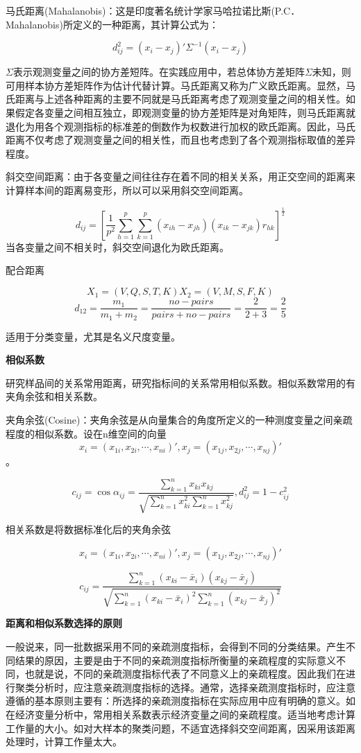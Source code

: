 \documentclass[]{ctexbook}
\begin{document}
马氏距离(Mahalanobis)：这是印度著名统计学家马哈拉诺比斯(P.C． Mahalanobis)所定义的一种距离，其计算公式为：

\[d_{ij}^2=(x_i-x_j)'\Sigma^{-1}(x_i-x_j)\]

\(\Sigma\)表示观测变量之间的协方差短阵。在实践应用中，若总体协方差矩阵\(\Sigma\)未知，则可用样本协方差矩阵作为估计代替计算。马氏距离又称为广义欧氏距离。显然，马氏距离与上述各种距离的主要不同就是马氏距离考虑了观测变量之间的相关性。如果假定各变量之间相互独立，即观测变量的协方差矩阵是对角矩阵，则马氏距离就退化为用各个观测指标的标准差的倒数作为权数进行加权的欧氏距离。因此，马氏距离不仅考虑了观测变量之间的相关性，而且也考虑到了各个观测指标取值的差异程度。

斜交空间距离：由于各变量之间往往存在着不同的相关关系，用正交空间的距离来计算样本间的距离易变形，所以可以采用斜交空间距离。

\[d_{ij}=[\frac{1}{p^2}\sum_{h=1}^p\sum_{k=1}^p(x_{ih}-x_{jh})(x_{ik}-x_{jk})r_{hk}]^{\frac{1}{2}}\]
当各变量之间不相关时，斜交空间退化为欧氏距离。

配合距离

\[X_1=(V,Q,S,T,K) X_2=(V,M,S,F,K)\]
\[d_{12}=\frac{m_1}{m_1+m_2}=\frac{no-pairs}{pairs+no-pairs}=\frac{2}{2+3}=\frac{2}{5}\]

适用于分类变量，尤其是名义尺度变量。

\textbf{相似系数}

研究样品间的关系常用距离，研究指标间的关系常用相似系数。相似系数常用的有夹角余弦和相关系数。

夹角余弦(Cosine)：夹角余弦是从向量集合的角度所定义的一种测度变量之间亲疏程度的相似系数。设在n维空间的向量
\[x_i=(x_{1i},x_{2i},\cdots,x_{ni})',x_j=(x_{1j},x_{2j},\cdots,x_{nj})'\]。

\[c_{ij}=\cos \alpha_{ij}=\frac{\sum_{k=1}^nx_{ki}x_{kj}}{\sqrt{\sum_{k=1}^nx_{ki}^2\sum_{k=1}^nx_{kj}^2}},d_{ij}^2=1-c_{ij}^2\]

相关系数是将数据标准化后的夹角余弦

\[x_i=(x_{1i},x_{2i},\cdots,x_{ni})',x_j=(x_{1j},x_{2j},\cdots,x_{nj})'\]

\[c_{ij}=\frac{\sum_{k=1}^n(x_{ki}-\bar x_i)(x_{kj}-\bar x_j)}{\sqrt{\sum_{k=1}^n(x_{ki}-\bar x_i)^2\sum_{k=1}^n(x_{kj}-\bar x_j)^2}}\]

\textbf{距离和相似系数选择的原则}

一般说来，同一批数据采用不同的亲疏测度指标，会得到不同的分类结果。产生不同结果的原因，主要是由于不同的亲疏测度指标所衡量的亲疏程度的实际意义不同，也就是说，不同的亲疏测度指标代表了不同意义上的亲疏程度。因此我们在进行聚类分析时，应注意亲疏测度指标的选择。通常，选择亲疏测度指标时，应注意遵循的基本原则主要有：所选择的亲疏测度指标在实际应用中应有明确的意义。如在经济变量分析中，常用相关系数表示经济变量之间的亲疏程度。适当地考虑计算工作量的大小。如对大样本的聚类问题，不适宜选择斜交空间距离，因采用该距离处理时，计算工作量太大。
\end{document}
